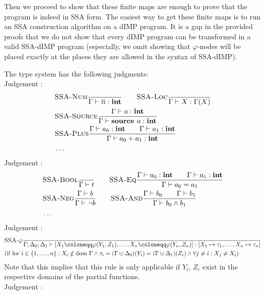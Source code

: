 Then we proceed to show that these finite maps are enough to prove that the program is indeed in SSA form.
The easiest way to get these finite maps is to run an SSA construction algorithm on a dIMP program.
It is a gap in the provided proofs that we do not show that every dIMP program
can be transformed in a valid SSA-dIMP program (especially, we omit showing that
$\varphi$-nodes will be placed exactly at the places they are allowed in the syntax
of SSA-dIMP).

The type system has the following judgments:
\\
Judgement :
\begin{align*}
    &\textsc{SSA-Num}\frac{\displaystyle }{\displaystyle \Gamma \vdash {\overline{n}}: \textbf{int}}\qquad
    \textsc{SSA-Loc}\frac{\displaystyle }{\displaystyle \Gamma \vdash {X}: \Gamma(X)}\\
    &\textsc{SSA-Source}\frac{\displaystyle \Gamma \vdash {a}: \textbf{int}}{\displaystyle \Gamma \vdash {\textbf{source }{a}}: \textbf{int}}\\
    &\textsc{SSA-Plus}\frac{\displaystyle \Gamma \vdash {a_0}: \textbf{int}\qquad\Gamma \vdash {a_1}: \textbf{int}}{\displaystyle \Gamma \vdash {a_0+a_1}: \textbf{int}}\\
    &\ldots
\end{align*}
Judgement :
\begin{align*}
    &\textsc{SSA-Bool}\frac{\displaystyle }{\displaystyle \Gamma \vdash {t}}\qquad
    \textsc{SSA-Eq}\frac{\displaystyle \Gamma \vdash {a_0}: \textbf{int}\qquad \Gamma \vdash {a_1}: \textbf{int}}{\displaystyle \Gamma \vdash {a_0 = a_1}}\\
    &\textsc{SSA-Neg}\frac{\displaystyle \Gamma \vdash {b}}{\displaystyle \Gamma \vdash {\neg b}}\qquad
    \textsc{SSA-And}\frac{\displaystyle \Gamma \vdash {b_0}\qquad\Gamma \vdash {b_1}}{\displaystyle \Gamma \vdash {b_0 \land b_1}}\\
    &\ldots
\end{align*}
Judgement :
\begin{align*}
    &\trule{SSA-$\varphi$}{}{\typestep{\Gamma;\Delta_0;\Delta_1}{\defaultphilistn}{[X_1 \mapsto \type_1, \ldots, X_n \mapsto \type_n]}}\\
    &\text{(if for $i \in \{1, \ldots, n\}: X_i \notin \dom\Gamma \land \type_i = (\Gamma \dunion \Delta_0)(Y_i) = (\Gamma \dunion \Delta_1)(Z_i)
    \land \forall j \neq i: X_j \neq X_i$)}
\end{align*}
Note that this implies that this rule is only applicable if $Y_i$, $Z_i$ exist in the respective domains
of the partial functions.
\\
Judgement :
